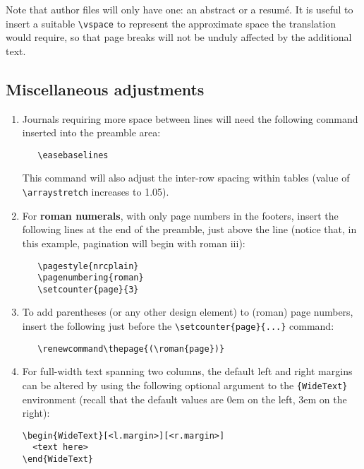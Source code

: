 \noindent Note that author files will only have one: an abstract or a
resum\'e. It is useful to insert a suitable \verb|\vspace| to
represent the approximate space the translation would require, so that
page breaks will not be unduly affected by the additional text.


\subsection{Miscellaneous adjustments}

\begin{enumerate} \itemsep=0pt
   \item Journals requiring more space between lines will need the
         following command inserted into the preamble area:
%
\begin{verbatim}
   \easebaselines
\end{verbatim}

         This command will also adjust the inter-row spacing within
         tables (value of \verb|\arraystretch| increases to 1.05).


   \item For {\bf roman numerals}, with only page numbers in the
         footers, insert the following lines at the end of the
         preamble, just above the \verb|| line (notice
         that, in this example, pagination will begin with roman iii):
%
\begin{verbatim}
   \pagestyle{nrcplain}
   \pagenumbering{roman}
   \setcounter{page}{3}
\end{verbatim}

   \item To add parentheses (or any other design element) to (roman)
         page numbers, insert the following just before the
         \verb|\setcounter{page}{...}| command:
%
\begin{verbatim}
   \renewcommand\thepage{(\roman{page})}
\end{verbatim}

   \item For full-width text spanning two columns, the default left
         and right margins can be altered by using the following
         optional argument to the \verb|{WideText}| environment
         (recall that the default values are 0em on the left, 3em on
         the right):

\begin{verbatim}
\begin{WideText}[<l.margin>][<r.margin>]
  <text here>
\end{WideText}
\end{verbatim}
\end{enumerate}


